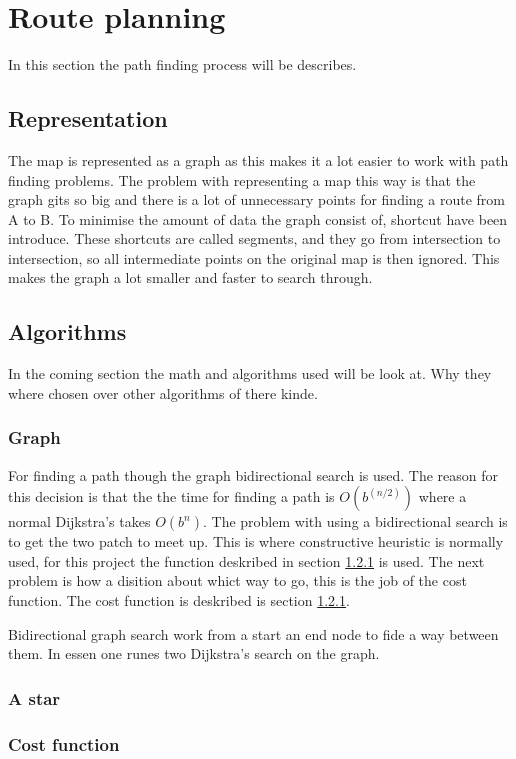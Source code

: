 \section{Route planning}


In this section the path finding process will be describes.

\subsection{Representation}
The map is represented as a graph as this makes it a lot easier to work with path finding problems. The problem with representing a map this way is that the graph gits so big and there is a lot of unnecessary points for finding a route from A to B. To minimise the amount of data the graph consist of, shortcut have been introduce. These shortcuts are called segments, and they go from intersection to intersection, so all intermediate points on the original map is then ignored. This makes the graph a lot smaller and faster to search through.

\subsection{Algorithms} \label{algorithms}
In the coming section the math and algorithms used will be look at. Why they where chosen over other algorithms of there kinde.

\subsubsection{Graph}\label{graph}
For finding a path though the graph bidirectional search is used. The reason for this decision is that the the time for finding a path is $O(b^{(n/2)})$ where a normal Dijkstra’s takes $O(b^{n})$. The problem with using a bidirectional search is to get the two patch to meet up. This is where constructive heuristic is normally used, for this project the function deskribed in section \ref{graph} is used. The next problem is how a disition about whict way to go, this is the job of the cost function. The cost function is deskribed is section \ref{graph}.

Bidirectional graph search work from a start an end node to fide a way between them. In essen one runes two Dijkstra's search on the graph.

\subsubsection{A star} \label{}


\subsubsection{Cost function} \label{}
